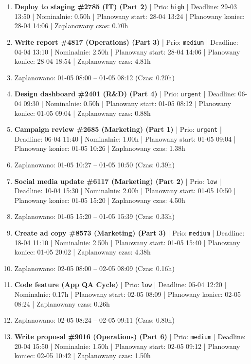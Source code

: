 {\begin{enumerate}
  \item [\textbf{14623}] \textbf{Deploy to staging \#2785 (IT) (Part 2)} | Prio: \texttt{high} | Deadline: 29-03 13:50 | Nominalnie: 0.50h | Planowany start: 28-04 13:24 | Planowany koniec: 28-04 14:06 | Zaplanowany czas: 0.70h
  \item [\textbf{14639}] \textbf{Write report \#4817 (Operations) (Part 3)} | Prio: \texttt{medium} | Deadline: 04-04 13:10 | Nominalnie: 2.50h | Planowany start: 28-04 14:06 | Planowany koniec: 28-04 18:54 | Zaplanowany czas: 4.81h
  \item [\textbf{PRZERWA}] Zaplanowano: 01-05 08:00 -- 01-05 08:12 (Czas: 0.20h)
  \item [\textbf{14603}] \textbf{Design dashboard \#2401 (R\&D) (Part 4)} | Prio: \texttt{urgent} | Deadline: 06-04 09:30 | Nominalnie: 0.50h | Planowany start: 01-05 08:12 | Planowany koniec: 01-05 09:04 | Zaplanowany czas: 0.88h
  \item [\textbf{14607}] \textbf{Campaign review \#2685 (Marketing) (Part 1)} | Prio: \texttt{urgent} | Deadline: 06-04 11:40 | Nominalnie: 1.00h | Planowany start: 01-05 09:04 | Planowany koniec: 01-05 10:26 | Zaplanowany czas: 1.38h
  \item [\textbf{PRZERWA}] Zaplanowano: 01-05 10:27 -- 01-05 10:50 (Czas: 0.39h)
  \item [\textbf{14700}] \textbf{Social media update \#6117 (Marketing) (Part 2)} | Prio: \texttt{low} | Deadline: 10-04 15:30 | Nominalnie: 2.00h | Planowany start: 01-05 10:50 | Planowany koniec: 01-05 15:20 | Zaplanowany czas: 4.50h
  \item [\textbf{PRZERWA}] Zaplanowano: 01-05 15:20 -- 01-05 15:39 (Czas: 0.33h)
  \item [\textbf{14677}] \textbf{Create ad copy \#8573 (Marketing) (Part 3)} | Prio: \texttt{medium} | Deadline: 18-04 11:10 | Nominalnie: 2.50h | Planowany start: 01-05 15:40 | Planowany koniec: 01-05 20:02 | Zaplanowany czas: 4.38h
  \item [\textbf{PRZERWA}] Zaplanowano: 02-05 08:00 -- 02-05 08:09 (Czas: 0.16h)
  \item [\textbf{14703}] \textbf{Code feature (App QA Cycle)} | Prio: \texttt{low} | Deadline: 05-04 12:20 | Nominalnie: 0.17h | Planowany start: 02-05 08:09 | Planowany koniec: 02-05 08:24 | Zaplanowany czas: 0.26h
  \item [\textbf{PRZERWA}] Zaplanowano: 02-05 08:24 -- 02-05 09:11 (Czas: 0.80h)
  \item [\textbf{14662}] \textbf{Write proposal \#9016 (Operations) (Part 6)} | Prio: \texttt{medium} | Deadline: 20-04 15:50 | Nominalnie: 1.50h | Planowany start: 02-05 09:12 | Planowany koniec: 02-05 10:42 | Zaplanowany czas: 1.50h

\end{enumerate}}
